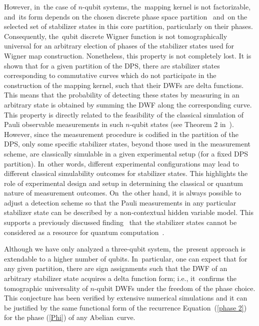 \documentclass[quantumrep,article,accept,pdftex,moreauthors]{Definitions/mdpi}
\begin{document}
However, in~the case of $n$-qubit systems, the~mapping kernel is not
factorizable, and~its form depends on the chosen discrete phase space partition~\cite{Bjork2007} and~on the selected set of stabilizer states in this core
partition, particularly on their phases. Consequently, the~qubit discrete Wigner
function is not tomographically universal for an arbitrary election of phases of
the stabilizer states used for  Wigner map construction. Nonetheless, this
property is not completely lost. It is shown that for a given partition of the
DPS, there are stabilizer states corresponding to commutative curves which do
not participate in the construction of the mapping kernel, such that their DWFs
are delta functions.  This means that the probability of detecting these states
by measuring in an arbitrary state is obtained by summing the DWF along the
corresponding curve. This property is directly related to the feasibility of
the classical simulation of Pauli observable measurements in such $n$-qubit states
(see Theorem 2 in~\cite{Raus17}). However, since the measurement procedure is
codified in the partition of the DPS, only some specific stabilizer states,
beyond those used in the measurement scheme, are classically simulable in a
given experimental setup (for a fixed DPS partition). In~other words, different
experimental configurations may lead to different classical simulability
outcomes for stabilizer states. This highlights the role of experimental design
and setup in determining the classical or quantum nature of measurement
outcomes. On~the other hand, it is always possible to adjust a detection scheme
so that the Pauli measurements in any particular stabilizer state can be
described by a non-contextual hidden variable model.  This supports a  previously
discussed finding~\cite{Raus17,contextMagic} that the stabilizer states cannot
be considered as a resource for quantum computation~\cite{gottKnill}.

Although we have only analyzed  a three-qubit system, the~present approach is
extendable to a higher number of qubits. In~particular, one can expect that for
any given partition, there are sign assignments such that the DWF of an
arbitrary stabilizer state acquires a delta function form; i.e., it~confirms the
tomographic universality of $n$-qubit DWFs under the freedom of the phase
choice. This conjecture has been verified by extensive numerical simulations
and it can be justified by the same functional form of the recurrence
Equation~(\ref{phase 2}) for the phase (\ref{Phi}) of any Abelian~curve.
\end{document}
